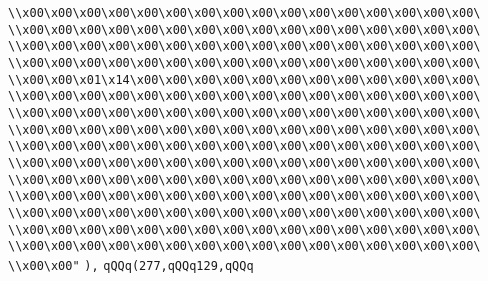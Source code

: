 \verb|\\x00\x00\x00\x00\x00\x00\x00\x00\x00\x00\x00\x00\x00\x00\x00\x00\|\newline
\verb|\\x00\x00\x00\x00\x00\x00\x00\x00\x00\x00\x00\x00\x00\x00\x00\x00\|\newline
\verb|\\x00\x00\x00\x00\x00\x00\x00\x00\x00\x00\x00\x00\x00\x00\x00\x00\|\newline
\verb|\\x00\x00\x00\x00\x00\x00\x00\x00\x00\x00\x00\x00\x00\x00\x00\x00\|\newline
\verb|\\x00\x00\x01\x14\x00\x00\x00\x00\x00\x00\x00\x00\x00\x00\x00\x00\|\newline
\verb|\\x00\x00\x00\x00\x00\x00\x00\x00\x00\x00\x00\x00\x00\x00\x00\x00\|\newline
\verb|\\x00\x00\x00\x00\x00\x00\x00\x00\x00\x00\x00\x00\x00\x00\x00\x00\|\newline
\verb|\\x00\x00\x00\x00\x00\x00\x00\x00\x00\x00\x00\x00\x00\x00\x00\x00\|\newline
\verb|\\x00\x00\x00\x00\x00\x00\x00\x00\x00\x00\x00\x00\x00\x00\x00\x00\|\newline
\verb|\\x00\x00\x00\x00\x00\x00\x00\x00\x00\x00\x00\x00\x00\x00\x00\x00\|\newline
\verb|\\x00\x00\x00\x00\x00\x00\x00\x00\x00\x00\x00\x00\x00\x00\x00\x00\|\newline
\verb|\\x00\x00\x00\x00\x00\x00\x00\x00\x00\x00\x00\x00\x00\x00\x00\x00\|\newline
\verb|\\x00\x00\x00\x00\x00\x00\x00\x00\x00\x00\x00\x00\x00\x00\x00\x00\|\newline
\verb|\\x00\x00\x00\x00\x00\x00\x00\x00\x00\x00\x00\x00\x00\x00\x00\x00\|\newline
\verb|\\x00\x00\x00\x00\x00\x00\x00\x00\x00\x00\x00\x00\x00\x00\x00\x00\|\newline
\verb|\\x00\x00"|\newline
\verb|),|\newline
\verb|qQQq(277,qQQq129,qQQq|\newline
